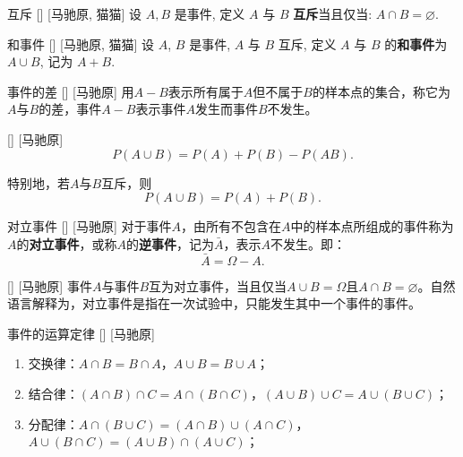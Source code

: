 \documentclass[UTF8]{ctexart}
\begin{document}
        \begin{dfn}
            []
            {互斥}
            []
            [马驰原, 猫猫]
            设 $A, B$ 是事件, 定义 $A$ 与 $B$ \textbf{互斥}当且仅当: $A\cap B=\varnothing$. 
        \end{dfn}

        \begin{dfn}
            []
            {和事件}
            []
            [马驰原, 猫猫]
            设 $A$, $B$ 是事件, $A$ 与 $B$ 互斥, 定义 $A$ 与 $B$ 的\textbf{和事件}为 $A\cup B$, 记为 $A+B$. 
        \end{dfn}

        \begin{dfn}
            []
            {事件的差}
            []
            [马驰原]
            用$A-B$表示所有属于$A$但不属于$B$的样本点的集合，称它为$A$与$B$的差，事件$A-B$表示事件$A$发生而事件$B$不发生。
        \end{dfn}

        \begin{ppt}
            []
            {}
            []
            [马驰原]
            \[P(A\cup B)=P(A)+P(B)-P(AB).\]
            
            特别地，若$A$与$B$互斥，则
            \[P(A\cup B)=P(A)+P(B).\]
        \end{ppt}

        \begin{dfn}
            []
            {对立事件}
            []
            [马驰原]
            对于事件$A$，由所有不包含在$A$中的样本点所组成的事件称为$A$的\textbf{对立事件}，或称$A$的\textbf{逆事件}，记为$\bar{A}$，表示$A$不发生。即：\[\bar{A}=\Omega-A.\]
        \end{dfn}

        \begin{ppt}
            []
            {}
            []
            [马驰原]
            事件$A$与事件$B$互为对立事件，当且仅当$A\cup B=\Omega$且$A\cap B=\varnothing$。自然语言解释为，对立事件是指在一次试验中，只能发生其中一个事件的事件。
        \end{ppt}

        \begin{ppt}
            []
            {事件的运算定律}
            []
            [马驰原]
            \begin{enumerate}
                \item 交换律：$A\cap B=B\cap A$，$A\cup B=B\cup A$；
                \item 结合律：$(A\cap B)\cap C=A\cap(B\cap C)$，$(A\cup B)\cup C=A\cup(B\cup C)$；
                \item 分配律：$A\cap(B\cup C)=(A\cap B)\cup(A\cap C)$，$A\cup(B\cap C)=(A\cup B)\cap(A\cup C)$；
            \end{enumerate}
        \end{ppt}
\end{document}
